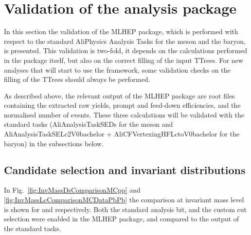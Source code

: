 \section{Validation of the analysis package}
\label{sec:validation}

In this section the validation of the MLHEP package, which is performed with respect to the standard AliPhysics Analysis Tasks for the \Ds meson and the \Lc baryon, is presented. This validation is two-fold, it depends on the calculations performed in the package itself, but also on the correct filling of the input TTrees. For new analyses that will start to use the framework, some validation checks on the filling of the TTrees should always be performed.

As described above, the relevant output of the MLHEP package are root files containing the extracted raw yields, prompt and feed-down efficiencies, and the normalised number of events. These three calculations will be validated with the standard tasks (AliAnalysisTaskSEDs for the \Ds meson and AliAnalysisTaskSELc2V0bachelor + AliCFVertexingHFLctoV0bachelor for the \Lc baryon) in the subsections below.

\subsection{Candidate selection and invariant distributions}
\label{subsec:invMassValidation}

In Fig.~\ref{fig:InvMassDsComparisonMCpp} and \ref{fig:InvMassLcComparisonMCDataPbPb} the comparison at invariant mass level is shown for \Ds and \Lc respectively. Both the standard analysis bit, and the custom cut selection were enabled in the MLHEP package, and compared to the output of the standard tasks.

